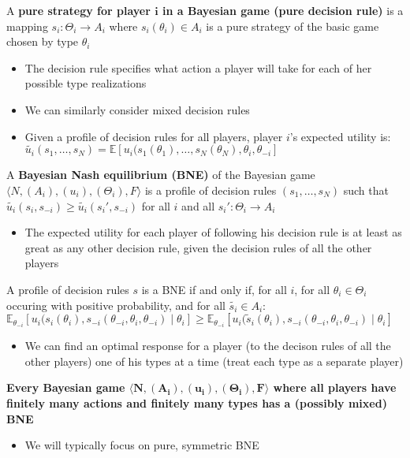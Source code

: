 \documentclass{report}
\begin{document}
A \textbf{pure strategy for player $\boldsymbol{i}$ in a Bayesian game (pure decision rule)} is a mapping $s_i: \Theta_i \rightarrow A_i$ where $s_i(\theta_i) \in A_i$ is a pure strategy of the basic game chosen by type $\theta_i$
\begin{itemize}
	\item The decision rule specifies what action a player will take for each of her possible type realizations
	\item We can similarly consider mixed decision rules
	\item Given a profile of decision rules for all players, player $i$'s expected utility is:\\ $\widetilde{u_i}(s_1,\dots,s_N) = \mathbb{E}[u_i(s_1(\theta_1),\dots,s_N(\theta_N), \theta_i, \theta_{-i}]$
\end{itemize} \bigskip \bigskip

A \textbf{Bayesian Nash equilibrium (BNE)} of the Bayesian game $\langle N,(A_i),(u_i),(\Theta_i),F \rangle$ is a profile of decision rules $(s_1,\dots,s_N)$ such that $\widetilde{u_i}(s_i,s_{-i}) \geq \widetilde{u_i}(s_i',s_{-i})$ for all $i$ and all $s_i':\Theta_i \rightarrow A_i$
\begin{itemize}
	\item The expected utility for each player of following his decision rule is at least as great as any other decision rule, given the decision rules of all the other players
\end{itemize} \newpage

A profile of decision rules $s$ is a BNE if and only if, for all $i$, for all $\theta_i \in \Theta_i$ occuring with positive probability, and for all $\widetilde{s_i} \in A_i$: \hspace{10pt} $\mathbb{E}_{\theta_{-i}} [u_i(s_i(\theta_i), s_{-i}(\theta_{-i},\theta_i,\theta_{-i}) \mid \theta_i] \geq \mathbb{E}_{\theta_{-i}} [u_i(\widetilde{s}_i(\theta_i), s_{-i}(\theta_{-i},\theta_i,\theta_{-i}) \mid \theta_i]$
\begin{itemize}
	\item We can find an optimal response for a player (to the decison rules of all the other players) one of his types at a time (treat each type as a separate player)
\end{itemize}

\bigskip \bigskip

\textbf{Every Bayesian game $\boldsymbol{\langle N,(A_i),(u_i),(\Theta_i),F \rangle}$ where all players have finitely many actions and finitely many types has a (possibly mixed) BNE}
\begin{itemize}
	\item We will typically focus on pure, symmetric BNE
\end{itemize}
\bigskip
\end{document}
